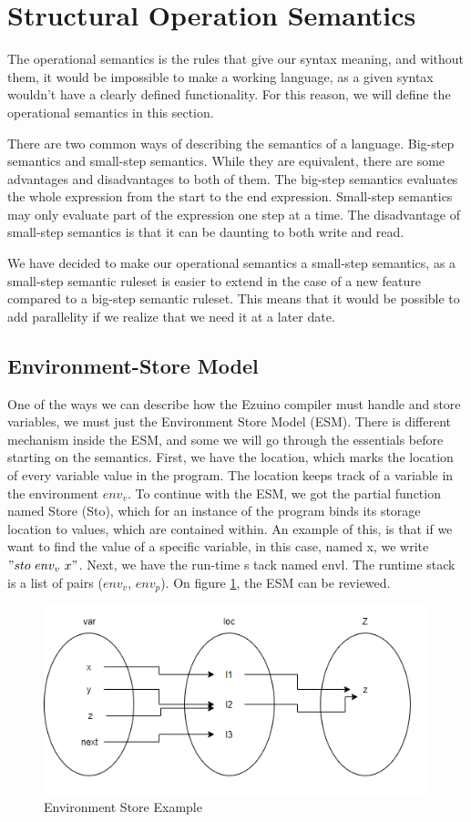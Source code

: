 \section{Structural Operation Semantics}
The operational semantics is the rules that give our syntax meaning, and without them, it would be impossible to make a working language, as a given syntax wouldn't have a clearly defined functionality. For this reason, we will define the operational semantics in this section.

There are two common ways of describing the semantics of a language. Big-step semantics and small-step semantics. While they are equivalent, there are some advantages and disadvantages to both of them. The big-step semantics evaluates the whole expression from the start to the end expression. Small-step semantics may only evaluate part of the expression one step at a time. The disadvantage of small-step semantics is that it can be daunting to both write and read.

We have decided to make our operational semantics a small-step semantics, as a small-step semantic ruleset is easier to extend in the case of a new feature compared to a big-step semantic ruleset. This means that it would be possible to add parallelity if we realize that we need it at a later date.

\subsection{Environment-Store Model}
One of the ways we can describe how the Ezuino compiler must handle and store variables, we must just the Environment Store Model (ESM). There is different mechanism inside the ESM, and some we will go through the essentials before starting on the semantics. First, we have the location, which marks the location of every variable value in the program. The location keeps track of a variable in the environment $env_v$.
To continue with the ESM, we got the partial function named Store (Sto), which for an instance of the program binds its storage location to values, which are contained within. An example of this, is that if we want to find the value of a specific variable, in this case, named x, we write $"sto \ env_v \ x"$.
Next, we have the run-time s tack named envl. The runtime stack is a list of pairs ($env_v$, $env_p$).
On figure \ref{evnstoreexmp}, the ESM can be reviewed.
\begin{figure}[H]
\centering
\includegraphics[scale=0.75]{figures/evnstore.png}
\caption{Environment Store Example}
\label{evnstoreexmp}
\end{figure}



